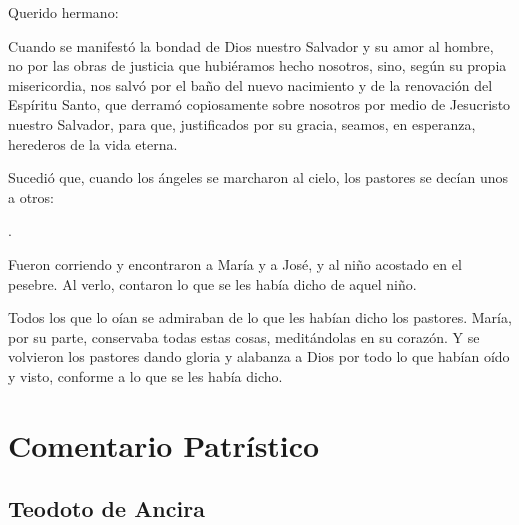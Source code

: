 \begin{scripture}
	Querido hermano:
	
	Cuando se manifestó la bondad de Dios nuestro Salvador y su amor al hombre, no por las obras de justicia que hubiéramos hecho nosotros, sino, según su propia misericordia, nos salvó por el baño del nuevo nacimiento y de la renovación del Espíritu Santo, que derramó copiosamente sobre nosotros por medio de Jesucristo nuestro Salvador, para que, justificados por su gracia, seamos, en esperanza, herederos de la vida eterna.
\end{scripture}


 


\begin{scripture}
	Sucedió que, cuando los ángeles se marcharon al cielo, los pastores se decían unos a otros:
	
	.
	
	Fueron corriendo y encontraron a María y a José, y al niño acostado en el pesebre. Al verlo, contaron lo que se les había dicho de aquel niño.
	
	Todos los que lo oían se admiraban de lo que les habían dicho los pastores. María, por su parte, conservaba todas estas cosas, meditándolas en su corazón. Y se volvieron los pastores dando gloria y alabanza a Dios por todo lo que habían oído y visto, conforme a lo que se les había dicho.
\end{scripture}


\newsection


\section{Comentario Patrístico}

\subsection{Teodoto de Ancira}



